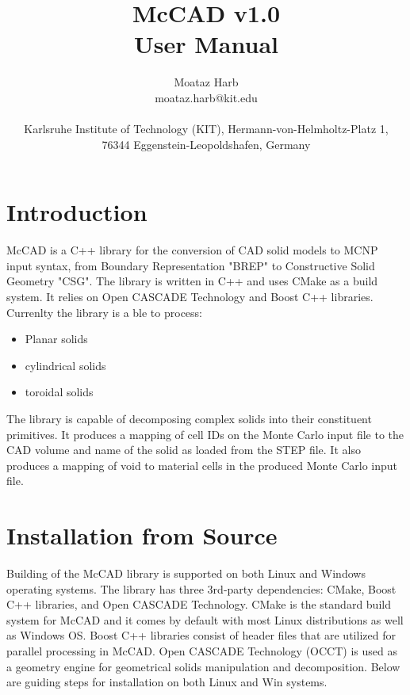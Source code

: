 \documentclass[letterpaper, 12 pt]{report}
\begin{document}
\title{McCAD v1.0 \\ User Manual}
\author{Moataz Harb \\ moataz.harb@kit.edu \\ \\ Karlsruhe Institute of Technology (KIT), Hermann-von-Helmholtz-Platz 1, \\ 76344 Eggenstein-Leopoldshafen, Germany}
\maketitle
\pagestyle{empty}

\tableofcontents
\newpage

\section{Introduction} \label{sec:Introduction}
McCAD is a C++ library for the conversion of CAD solid models to MCNP input syntax, from Boundary Representation "BREP" to Constructive Solid Geometry "CSG". The library is written in C++ and uses CMake as a build system. It relies on Open CASCADE Technology and Boost C++ libraries. Currenlty the library is a ble to process:
\begin{itemize}
	\item Planar solids
	\item cylindrical solids
	\item toroidal solids
\end{itemize}

The library is capable of decomposing complex solids into their constituent primitives. It produces a mapping of cell IDs on the Monte Carlo input file to the CAD volume and name of the solid as loaded from the STEP file. It also produces a mapping of void to material cells in the produced Monte Carlo input file.

\section{Installation from Source} \label{sec:Installation from Source}
Building of the McCAD library is supported on both Linux and Windows operating systems. The library has three 3rd-party dependencies: CMake, Boost C++ libraries, and Open CASCADE Technology. CMake is the standard build system for McCAD and it comes by default with most Linux distributions as well as Windows OS. Boost C++ libraries consist of header files that are utilized for parallel processing in McCAD. Open CASCADE Technology (OCCT) is used as a geometry engine for geometrical solids manipulation and decomposition. Below are guiding steps for installation on both Linux and Win systems. 
\end{document}
